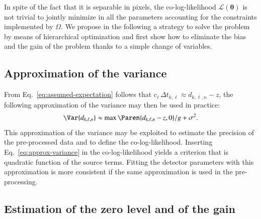 \documentclass{aa}
\newcommand{\oops}[1]{\textcolor[named]{OrangeRed1}{#1}}
\newcommand*{\V}[1]{\boldsymbol{#1}}   %
\newcommand*{\MC}[1]{\mathcal{#1}}
\newcommand*{\lkl}{\MC{L}}
\begin{document}
In spite of the fact that it is separable in pixels, the co-log-likelihood
$\lkl(\V\theta)$ is not trivial to jointly minimize in all the parameters
accounting for the constraints implemented by $\Omega$.  \oops{We propose in the
following a strategy to solve the problem by means of hierarchical optimization
and first show how to eliminate the bias and the gain of the problem thanks to
a simple change of variables.}

\subsection{Approximation of the variance}

From Eq.~\eqref{eq:assumed-expectation} follows that $c_{\ell}\,\Delta
t_{k,\ell} \approx d_{k,\ell,n} - z$, the following approximation of the
variance may then be used in practice:
\begin{equation}
  \label{eq:approx-variance}
  \Var{d_{k,\ell,n}} \approx \max\Paren{d_{k,\ell,n} - z,0}/g + \sigma^2.
\end{equation}
This approximation of the variance may be exploited to estimate the precision
of the pre-processed data and to define the co-log-likelihood.  Inserting
Eq.~\eqref{eq:approx-variance} in the co-log-likelihood yields a criterion that
is quadratic function of the source terms.  Fitting the detector parameters
with this approximation is more consistent if the same approximation is used in
the pre-processing.


\subsection{Estimation of the zero level and of the gain}
\end{document}
